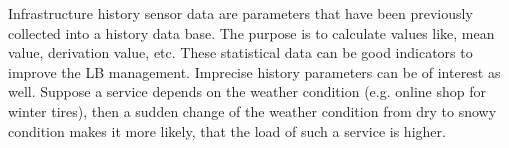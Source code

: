 Infrastructure history sensor data are parameters that have been previously collected into a history data base. The purpose is to calculate values like, mean value, derivation value, etc. These statistical data can be good indicators to improve the LB management.
Imprecise history parameters can be of interest as well. Suppose a service depends on the weather condition (e.g. online shop for winter tires), then a sudden change of the weather condition from dry to snowy condition makes it more likely, that the load of such a service is higher.

